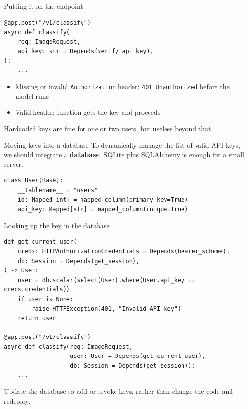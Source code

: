 \documentclass[aspectratio=169]{beamer}
\begin{document}
\begin{frame}[fragile]{Putting it on the endpoint}
    \begin{verbatim}
@app.post("/v1/classify")
async def classify(
    req: ImageRequest,
    api_key: str = Depends(verify_api_key),
):
    ...
    \end{verbatim}

    \vspace{0.5em}
    \begin{itemize}
        \item Missing or invalid \texttt{Authorization} header: \texttt{401 Unauthorized} before the model runs
        \item Valid header: function gets the key and proceeds
    \end{itemize}

    Hardcoded keys are fine for one or two users, but useless beyond that.
\end{frame}

\begin{frame}[fragile]{Moving keys into a database}
To dynamically manage the list of valid API keys, we should integrate a \textbf{database}.
SQLite plus SQLAlchemy is enough for a small server.

    \begin{verbatim}
class User(Base):
    __tablename__ = "users"
    id: Mapped[int] = mapped_column(primary_key=True)
    api_key: Mapped[str] = mapped_column(unique=True)
    \end{verbatim}

\end{frame}

\begin{frame}[fragile]{Looking up the key in the database}
    \begin{verbatim}
def get_current_user(
    creds: HTTPAuthorizationCredentials = Depends(bearer_scheme),
    db: Session = Depends(get_session),
) -> User:
    user = db.scalar(select(User).where(User.api_key == creds.credentials))
    if user is None:
        raise HTTPException(401, "Invalid API key")
    return user

@app.post("/v1/classify")
async def classify(req: ImageRequest,
                   user: User = Depends(get_current_user),
                   db: Session = Depends(get_session)):
    ...
    \end{verbatim}

    Update the database to add or revoke keys, rather than change the code and redeploy.
\end{frame}
\end{document}
